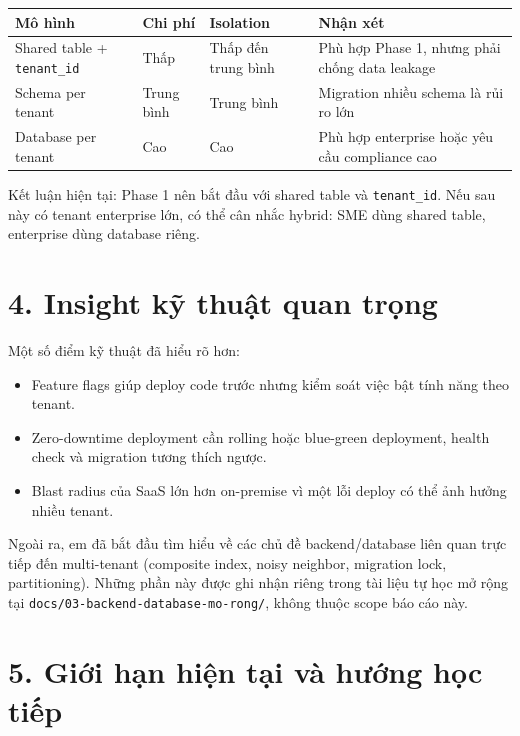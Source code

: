 \documentclass[12pt,a4paper]{article}
\begin{document}
    \begin{longtable}{|p{4cm}|p{3cm}|p{3cm}|p{4cm}|}
        \hline
        \textbf{Mô hình} & \textbf{Chi phí} & \textbf{Isolation} & \textbf{Nhận xét} \\
        \hline
        Shared table + \texttt{tenant\_id} & Thấp & Thấp đến trung bình & Phù hợp Phase 1, nhưng phải chống data leakage \\
        \hline
        Schema per tenant & Trung bình & Trung bình & Migration nhiều schema là rủi ro lớn \\
        \hline
        Database per tenant & Cao & Cao & Phù hợp enterprise hoặc yêu cầu compliance cao \\
        \hline
    \end{longtable}

    Kết luận hiện tại: Phase 1 nên bắt đầu với shared table và \texttt{tenant\_id}. Nếu sau này có tenant enterprise lớn, có thể cân nhắc hybrid: SME dùng shared table, enterprise dùng database riêng.

    \section*{4. Insight kỹ thuật quan trọng}

    Một số điểm kỹ thuật đã hiểu rõ hơn:

    \begin{itemize}[leftmargin=*]
    \item Feature flags giúp deploy code trước nhưng kiểm soát việc bật tính năng theo tenant.
    \item Zero-downtime deployment cần rolling hoặc blue-green deployment, health check và migration tương thích ngược.
    \item Blast radius của SaaS lớn hơn on-premise vì một lỗi deploy có thể ảnh hưởng nhiều tenant.
    \end{itemize}

    Ngoài ra, em đã bắt đầu tìm hiểu về các chủ đề backend/database liên quan trực tiếp đến multi-tenant (composite index, noisy neighbor, migration lock, partitioning). Những phần này được ghi nhận riêng trong tài liệu tự học mở rộng tại \texttt{docs/03-backend-database-mo-rong/}, không thuộc scope báo cáo này.

    \section*{5. Giới hạn hiện tại và hướng học tiếp}
\end{document}
